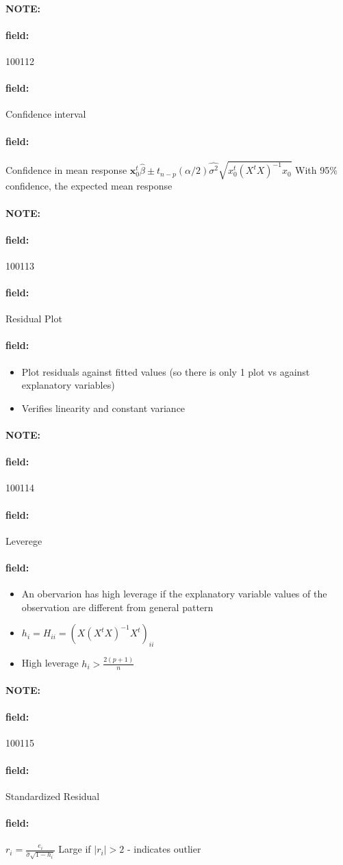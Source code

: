 \documentclass[12pt]{article}
\newenvironment{note}{\paragraph{NOTE:}}{}
\newenvironment{field}{\paragraph{field:}}{}
\begin{document}
\begin{note} \begin{field} \tiny 100112 \end{field}
  \begin{field}
    Confidence interval
  \end{field}
  \begin{field}
    Confidence in mean response $\mathbf{x}_0^t \hat{\beta} \pm t_{n-p}(\alpha/2)\hat{\sigma^2} \sqrt{x_0^t(X^tX)^{-1}x_0}$
    With 95\% confidence, the expected mean response
  \end{field}
\end{note}


\begin{note} \begin{field} \tiny 100113 \end{field}
  \begin{field}
    Residual Plot
  \end{field}
  \begin{field}
    \begin{itemize}
      \item Plot residuals against fitted values (so there is only 1 plot vs against explanatory variables)
      \item Verifies linearity and constant variance
    \end{itemize}
  \end{field}
\end{note}

\begin{note} \begin{field} \tiny 100114 \end{field}
  \begin{field}
    Leverege
  \end{field}
  \begin{field}
    \begin{itemize}
      \item An obervarion has high leverage if the explanatory variable values of the observation are different from general pattern
      \item $h_i = H_{ii} = (X(X^tX)^{-1}X^t)_{ii}$
      \item High leverage $h_i > \frac{2(p+1)}{n}$
    \end{itemize}
  \end{field}
\end{note}

\begin{note} \begin{field} \tiny 100115 \end{field}
  \begin{field}
    Standardized Residual
  \end{field}
  \begin{field}
    $r_i = \frac{e_i}{\hat{\sigma}\sqrt{1 - h_i}}$
    Large if $|r_i| > 2$ - indicates outlier
  \end{field}
\end{note}
\end{document}
